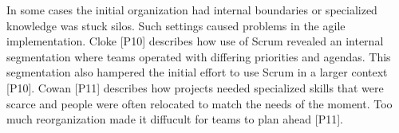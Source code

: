 \documentclass[preprint,authoryear,12pt]{elsarticle}
\begin{document}
In some cases the initial organization had internal boundaries or specialized
knowledge was stuck silos. Such settings caused problems in the agile
implementation.
Cloke [P10] describes how use of Scrum revealed an internal segmentation where
teams operated with differing priorities and agendas. This segmentation also
hampered the initial effort to use Scrum in a larger context [P10].
Cowan [P11] describes how projects needed specialized skills that were scarce
and people were often relocated to match the needs of the moment. Too much
reorganization made it diffucult for teams to plan ahead [P11].


%




\end{document}
